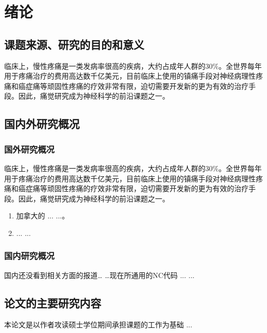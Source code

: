 \chapter{绪论} \label{chap:review}
\section{课题来源、研究的目的和意义} \label{sec:review:purpose}

临床上，慢性疼痛是一类发病率很高的疾病，大约占成年人群的30\%。全世界每年用于疼痛治疗的费用高达数千亿美元，目前临床上使用的镇痛手段对神经病理性疼痛和癌症痛等顽固性疼痛的疗效非常有限，迫切需要开发新的更为有效的治疗手段。因此，痛觉研究成为神经科学的前沿课题之一。


\section{国内外研究概况}\label{sec:review:current}
\subsection{国外研究概况}\label{subsec:review:current:foreign}
临床上，慢性疼痛是一类发病率很高的疾病，大约占成年人群的30\%。全世界每年用于疼痛治疗的费用高达数千亿美元，目前临床上使用的镇痛手段对神经病理性疼痛和癌症痛等顽固性疼痛的疗效非常有限，迫切需要开发新的更为有效的治疗手段。因此，痛觉研究成为神经科学的前沿课题之一。

\begin{enumerate}
\item 加拿大的 ... ...。
\item ... ...
\end{enumerate}


\subsection{国内研究概况}\label{subsec:review:current:domestic}
国内还没看到相关方面的报道… …现在所通用的NC代码 \cite{vossel_spatial_2014} ... ...



\section{论文的主要研究内容}\label{sec:review:research}
本论文是以作者攻读硕士学位期间承担课题的工作为基础 ...

